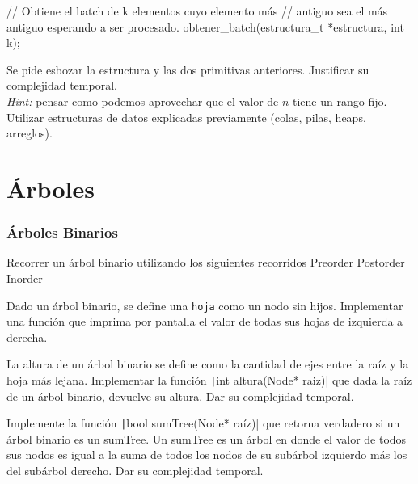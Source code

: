 \documentclass[titlepage,oneside]{book}
\begin{document}
\begin{Exercise}[difficulty=1]
\begin{ccode}
		// Obtiene el batch de k elementos cuyo elemento más
		// antiguo sea el más antiguo esperando a ser procesado.
		obtener_batch(estructura_t *estructura, int k);
	\end{ccode}

Se pide esbozar la estructura y las dos primitivas anteriores. Justificar su complejidad temporal.
\\
\textit{Hint: } pensar como podemos aprovechar que el valor de $n$ tiene un rango fijo. Utilizar estructuras de datos explicadas previamente (colas, pilas, heaps, arreglos).

\end{Exercise}

\chapter{Árboles}

\subsection{Árboles Binarios}

\begin{Exercise}
	Recorrer un árbol binario utilizando los siguientes recorridos
	\Question Preorder
	\Question Postorder
        \Question Inorder
\end{Exercise}

\begin{Exercise}
	Dado un árbol binario, se define una \texttt{hoja} como un nodo sin hijos. Implementar una función que imprima por pantalla el valor de todas sus hojas de izquierda a derecha.
\end{Exercise}

\begin{Exercise}
    La altura de un árbol binario se define como la cantidad de ejes entre la raíz y la hoja más lejana. Implementar la función \texttt|int altura(Node* raiz)| que dada la raíz de un árbol binario, devuelve su altura. Dar su complejidad temporal.
\end{Exercise}

\begin{Exercise}
   Implemente la función \texttt|bool sumTree(Node* raíz)| que retorna verdadero si un árbol binario es un sumTree. Un sumTree es un árbol en donde el valor de todos sus nodos es igual a la suma de todos los nodos de su subárbol izquierdo más los del subárbol derecho. Dar su complejidad temporal.
\end{Exercise}
\end{document}

